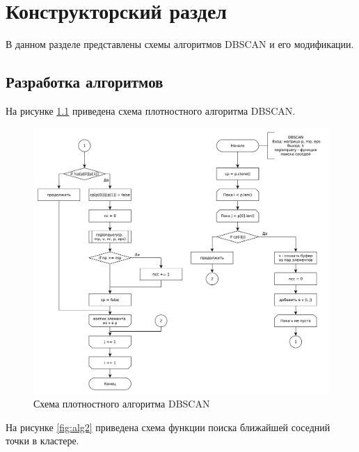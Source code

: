 \chapter{Конструкторский раздел}

В данном разделе представлены схемы алгоритмов DBSCAN и его модификации.

\section{Разработка алгоритмов}
 
На рисунке \ref{fig:alg} приведена схема плотностного алгоритма DBSCAN.

\begin{figure}[ht!]
	\centering
	\includegraphics[width=1\linewidth]{assets/graphs/dbscan.pdf}
	\caption{Схема плотностного алгоритма DBSCAN}
	\label{fig:alg}
\end{figure}

На рисунке \ref{fig:alg2} приведена схема функции поиска ближайшей соседний точки в кластере.

